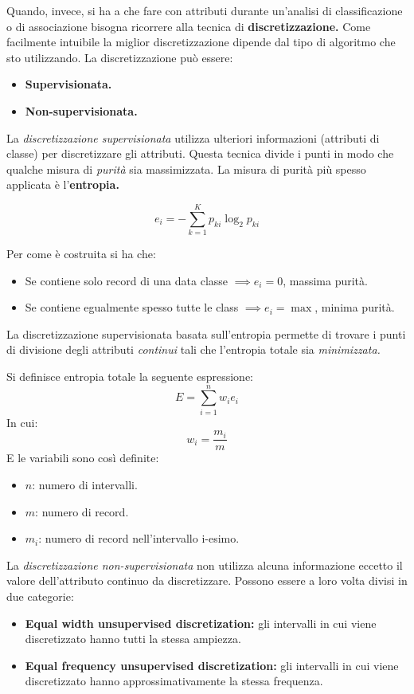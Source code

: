  Quando, invece, si ha a che fare con attributi durante un'analisi di classificazione o di associazione bisogna ricorrere alla tecnica di \textbf{discretizzazione.} Come facilmente intuibile la miglior discretizzazione dipende dal tipo di algoritmo che sto utilizzando.
 La discretizzazione può essere:
 
 \begin{itemize}
 	\item \textbf{Supervisionata.}
 	\item \textbf{Non-supervisionata.}
 \end{itemize}
La \textit{discretizzazione supervisionata} utilizza ulteriori informazioni (attributi di classe) per discretizzare gli attributi. Questa tecnica divide i punti in modo che qualche misura di \textit{purità} sia massimizzata. La misura di purità più spesso applicata è l'\textbf{entropia.}
 	
 	\[e_{i} = - \sum_{k = 1}^{K}p_{ki}\log_{2}p_{ki}\]
 	
Per come è costruita si ha che:
\begin{itemize}
	\item Se contiene solo record di una data classe $\implies e_{i} = 0$, massima purità. 
	\item Se contiene egualmente spesso tutte le class $\implies e_{i} = \max$, minima purità. 
\end{itemize}

La discretizzazione supervisionata basata sull'entropia permette di trovare i punti di divisione degli attributi \textit{continui} tali che l'entropia totale sia \textit{minimizzata.}

\begin{defn}
	Si definisce entropia totale la seguente espressione:
	\[ E = \sum_{i = 1}^{n}w_{i}e_{i}\] 
	In cui:
	\[w_{i} = \frac{m_{i}}{m}\]
	E le variabili sono così definite: \begin{itemize}
		\item $n$: numero di intervalli.
		\item $m$: numero di record.
		\item $m_{i}$: numero di record nell'intervallo i-esimo.
	\end{itemize}
\end{defn}


 	
La \textit{discretizzazione non-supervisionata} non utilizza alcuna informazione eccetto il valore dell'attributo continuo da discretizzare. Possono essere a loro volta divisi in due categorie:
 	\begin{itemize}
 		\item \textbf{Equal width unsupervised discretization:}  gli intervalli in cui viene discretizzato hanno tutti la stessa ampiezza.
 		\item  \textbf{Equal frequency unsupervised discretization:} gli intervalli in cui viene discretizzato hanno approssimativamente la stessa frequenza.
 	\end{itemize}
 
